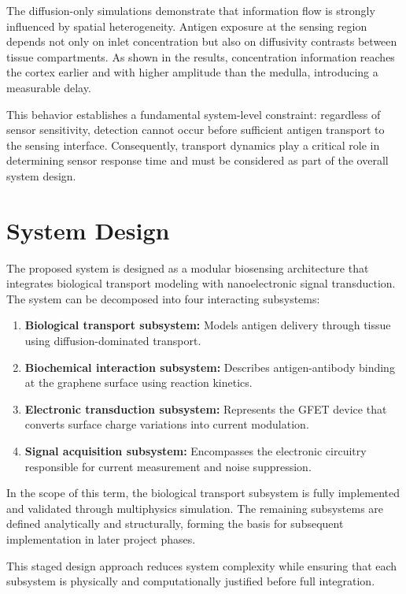 \documentclass[12pt,a4paper]{report}
\begin{document}
The diffusion-only simulations demonstrate that information flow is strongly influenced by spatial heterogeneity. Antigen exposure at the sensing region depends not only on inlet concentration but also on diffusivity contrasts between tissue compartments. As shown in the results, concentration information reaches the cortex earlier and with higher amplitude than the medulla, introducing a measurable delay.

This behavior establishes a fundamental system-level constraint: regardless of sensor sensitivity, detection cannot occur before sufficient antigen transport to the sensing interface. Consequently, transport dynamics play a critical role in determining sensor response time and must be considered as part of the overall system design.

\section{System Design}

The proposed system is designed as a modular biosensing architecture that integrates biological transport modeling with nanoelectronic signal transduction. The system can be decomposed into four interacting subsystems:

\begin{enumerate}
    \item \textbf{Biological transport subsystem:} Models antigen delivery through tissue using diffusion-dominated transport.
    \item \textbf{Biochemical interaction subsystem:} Describes antigen-antibody binding at the graphene surface using reaction kinetics.
    \item \textbf{Electronic transduction subsystem:} Represents the GFET device that converts surface charge variations into current modulation.
    \item \textbf{Signal acquisition subsystem:} Encompasses the electronic circuitry responsible for current measurement and noise suppression.
\end{enumerate}

In the scope of this term, the biological transport subsystem is fully implemented and validated through multiphysics simulation. The remaining subsystems are defined analytically and structurally, forming the basis for subsequent implementation in later project phases.

This staged design approach reduces system complexity while ensuring that each subsystem is physically and computationally justified before full integration.
\end{document}
